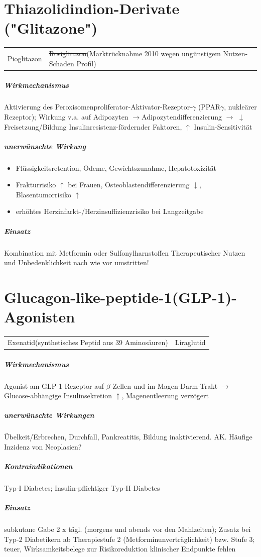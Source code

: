 \documentclass[10pt,a4paper]{report}
\begin{document}
\section{Thiazolidindion-Derivate ("Glitazone")} %
\label{sec:thiazolidindion_derivate_}

\begin{tabularx}{\textwidth}{XX}
Pioglitazon& \sout{Rosiglitazon}(Marktrücknahme 2010 wegen ungünstigem Nutzen-Schaden Profil)
\end{tabularx}

\subparagraph{Wirkmechanismus} %
\label{subp:wirkmechanismus}
Aktivierung des Peroxisomenproliferator-Aktivator-Rezeptor-$\gamma$ (PPAR$\gamma$, nukleärer Rezeptor); Wirkung v.a. auf Adipozyten $\rightarrow$Adipozytendifferenzierung $\rightarrow$ $\downarrow$ Freisetzung/Bildung Insulinresistenz-fördernder Faktoren, $\uparrow$ Insulin-Sensitivität
\subparagraph{unerwünschte Wirkung} %
\label{subp:unerw_nschte_wirkung}
\begin{itemize}
	\item Flüssigkeitsretention, Ödeme, Gewichtszunahme, Hepatotoxizität
	\item Frakturrisiko $\uparrow$ bei Frauen, Osteoblastendifferenzierung $\downarrow$, Blasentumorrisiko $\uparrow$
	\item erhöhtes Herzinfarkt-/Herzinsuffizienzrisiko bei Langzeitgabe
\end{itemize}

\subparagraph{Einsatz} %
\label{subp:einsatz}
Kombination mit Metformin oder Sulfonylharnstoffen 
Therapeutischer Nutzen und Unbedenklichkeit nach wie vor umstritten!
\section{Glucagon-like-peptide-1(GLP-1)-Agonisten} %
\label{sec:glucagon_like_peptide_1_glp_1_agonisten}
\begin{tabularx}{\textwidth}{XX}
Exenatid(synthetisches Peptid aus 39 Aminosäuren)&Liraglutid\\
\end{tabularx}
\subparagraph{Wirkmechanismus} %
\label{subp:wirkmechanismus}
Agonist am GLP-1 Rezeptor auf $\beta$-Zellen und im Magen-Darm-Trakt $\rightarrow$ Glucose-abhängige Insulinsekretion $\uparrow$, Magenentleerung verzögert
\subparagraph{unerwünschte Wirkungen} %
\label{subp:unerw_nschte_wirkungen}
Übelkeit/Erbrechen, Durchfall, Pankreatitis, Bildung inaktivierend. AK. Häufige Inzidenz von Neoplasien?
\subparagraph{Kontraindikationen} %
\label{subp:kontraindikationen}
Typ-I Diabetes; Insulin-pflichtiger Typ-II Diabetes 
\subparagraph{Einsatz} %
\label{subp:einsatz}
subkutane Gabe 2 x tägl. (morgens und abends vor den Mahlzeiten); Zusatz bei Typ-2 Diabetikern ab Therapiestufe 2 (Metforminunverträglichkeit) bzw. Stufe 3; teuer, Wirksamkeitsbelege zur Risikoreduktion klinischer Endpunkte fehlen 
\end{document}
